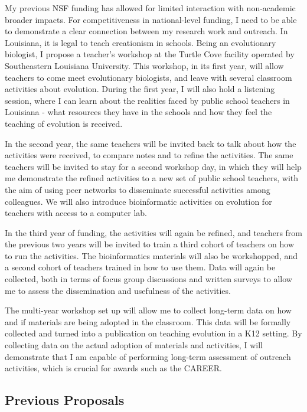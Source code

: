\documentclass[]{article}
\begin{document}
My previous NSF funding has allowed for limited interaction with non-academic broader impacts.
For competitiveness in national-level funding, I need to be able to demonstrate a clear connection between my research work and outreach.
In Louisiana, it is legal to teach creationism in schools.
Being an evolutionary biologist, I propose a teacher's workshop at the Turtle Cove facility operated by Southeastern Louisiana University.
This workshop, in its first year, will allow teachers to come meet evolutionary biologists, and leave with several classroom activities about evolution.
During the first year, I will also hold a listening session, where I can learn about the realities faced by public school teachers in Louisiana - what resources they have in the schools and how they feel the teaching of evolution is received. \par
In the second year, the same teachers will be invited back to talk about how the activities were received, to compare notes and to refine the activities. 
The same teachers will be invited to stay for a second workshop day, in which they will help me demonstrate the refined activities to a new set of public school teachers, with the aim of using peer networks to disseminate successful activities among colleagues.
We will also introduce bioinformatic activities on evolution for teachers with access to a computer lab. \par
In the third year of funding, the activities will again be refined, and teachers from the previous two years will be invited to train a third cohort of teachers on how to run the activities.
The bioinformatics materials will also be workshopped, and a second cohort of teachers trained in how to use them.
Data will again be collected, both in terms of focus group discussions and written surveys to allow me to assess the dissemination and usefulness of the activities. \par
The multi-year workshop set up will allow me to collect long-term data on how and if materials are being adopted in the classroom.
This data will be formally collected and turned into a publication on teaching evolution in a K12 setting.
By collecting data on the actual adoption of materials and activities, I will demonstrate that I am capable of performing long-term assessment of outreach activities, which is crucial for awards such as the CAREER. 
\par

\subsection{Previous Proposals}
\end{document}
